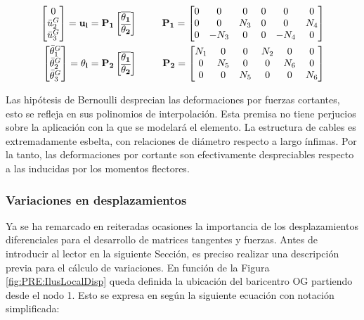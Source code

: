  
 \begin{eqnarray}
 	\label{Eqn:PRE:CompactTransveralDisp}
		\begin{bmatrix}
			0     \\
		\bar{u}_2^G \\
		\bar{u}_3^G
	\end{bmatrix}=\bf{u_l}=\bf{P}_1
	\begin{bmatrix}
			\overline{\bf{\theta_1}}\\
			\overline{\bf{\theta_2}} 
	\end{bmatrix} &~~~~~ &
	\bf{P}_1 = \begin{bmatrix}
		 0 &   0  & 0 & 0  & 0 & 0 \\
		 0  &  0 & N_3 & 0 & 0 & N_4 \\
		 0  &  -N_3  & 0 & 0 & -N_4 & 0
	\end{bmatrix} \\
	\label{Eqn:PRE:CompactTransversalAngs}
		\begin{bmatrix}
			\bar{\theta}_1^G\\
			\bar{\theta}_2^G \\
			\bar{\theta}_3^G
		\end{bmatrix}=\bf{\theta_l}=\bf{P}_2
		\begin{bmatrix}
			\overline{\bf{\theta_1}}\\
			\overline{\bf{\theta_2}} 
		\end{bmatrix}& ~~~~~ &\bf{P}_2=
	\begin{bmatrix}
	N_1 & 0 & 0 & N_2 & 0 & 0 \\
	0  & N_5 & 0 & 0 &N_6 &0 \\
	0  &  0  & N_5 & 0 & 0 &N_6
	\end{bmatrix}
 \end{eqnarray}

Las hipótesis de Bernoulli desprecian las deformaciones por fuerzas cortantes, esto se refleja en sus polinomios de interpolación. Esta premisa no tiene perjucios sobre la aplicación con la que se modelará el elemento. La estructura de cables es extremadamente esbelta, con relaciones de diámetro respecto a largo ínfimas. Por la tanto, las deformaciones por cortante son efectivamente despreciables respecto a las inducidas por los momentos flectores. 

\subsubsection{Variaciones en desplazamientos} \label{Sec:PRE:VariacionesDesplazamientos}
Ya se ha remarcado en reiteradas ocasiones la importancia de los desplazamientos diferenciales para el desarrollo de matrices tangentes y fuerzas. Antes de introducir al lector en la siguiente Sección, es preciso realizar una descripción previa para el cálculo de variaciones. En función de la Figura \ref{fig:PRE:IlusLocalDisp} queda definida la ubicación del baricentro OG partiendo desde el nodo 1. Esto se expresa en según la siguiente ecuación con notación simplificada:
 
